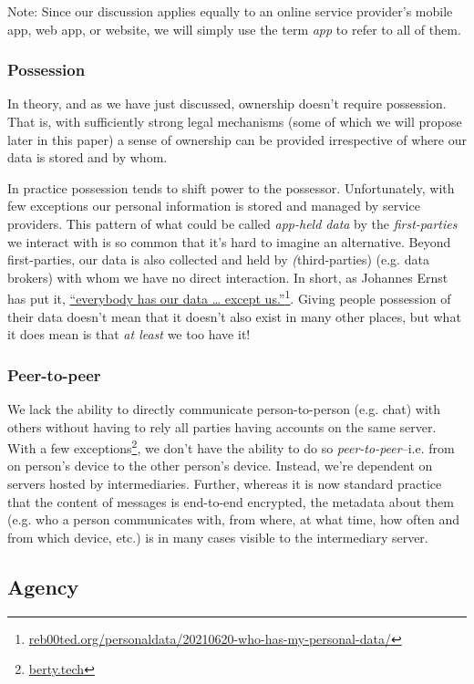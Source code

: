 \documentclass[11pt, oneside]{article}   	%
\newcommand{\hyperfootnote}[1][]{\def\ArgI{{#1}}\hyperfootnoteRelay}
\newcommand\hyperfootnoteRelay[2][]{\href{#1#2}{\ArgI}\footnote{\href{#1#2}{#2}}}
\begin{document}
Note: Since our discussion applies equally to an online service provider's mobile app, web app, or website, we will simply use the term \emph{app} to refer to all of them.

\subsubsection{Possession} 

In theory, and as we have just discussed, ownership doesn't require possession. That is, with sufficiently strong legal mechanisms (some of which we will propose later in this paper) a sense of ownership can be provided irrespective of where our data is stored and by whom. 

In practice possession tends to shift power to the possessor. Unfortunately, with few exceptions our personal information is stored and managed by service providers. This pattern of what could be called \emph{app-held data} by the \emph{first-parties} we interact with is so common that it's hard to imagine an alternative. Beyond first-parties, our data is also collected and held by \emph(third-parties) (e.g. data brokers) with whom we have no direct interaction. In short, as Johannes Ernst has put it, \hyperfootnote[“everybody has our data … except us.”][https://]{reb00ted.org/personaldata/20210620-who-has-my-personal-data/}. Giving people possession of their data doesn't mean that it doesn't also exist in many other places, but what it does mean is that \emph{at least} we too have it!

\subsubsection{Peer-to-peer}

We lack the ability to directly communicate person-to-person (e.g. chat) with others without having to rely all parties having accounts on the same server. With a few exceptions\hyperfootnote[][https://]{berty.tech}, we don't have the ability to do so \emph{peer-to-peer}--i.e. from on person's device to the other person's device. Instead, we're dependent on servers hosted by intermediaries. Further, whereas it is now standard practice that the content of messages is end-to-end encrypted, the metadata about them (e.g. who a person communicates with, from where, at what time, how often and from which device, etc.) is in many cases visible to the intermediary server.  

\subsection{Agency}
\end{document}
